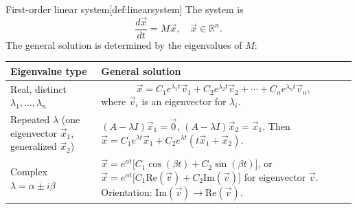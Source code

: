 \begin{define}{First-order linear system}[def:linearsystem]
  The system is
  $$
  \frac{d\vec{x}}{dt} = M\vec{x},\quad \vec{x} \in \mathbb{R}^n.
  $$
  The general solution is determined by the eigenvalues of $M$:

  \renewcommand{\arraystretch}{1.6}%
  \begin{center}
  \small
  \begin{tabularx}{\textwidth}{|l|X|}
    \hline
    \textbf{Eigenvalue type} & \textbf{General solution} \\
    \hline
    Real, distinct $\lambda_1,\ldots,\lambda_n$ & 
    \[
    \vec{x} = C_1 e^{\lambda_1 t}\vec{v}_1 + C_2 e^{\lambda_2 t}\vec{v}_2 + \cdots + C_n e^{\lambda_n t}\vec{v}_n,
    \]
    where $\vec{v}_i$ is an eigenvector for $\lambda_i$. \\
    \hline
    Repeated $\lambda$ (one eigenvector $\vec{x}_1$, generalized $\vec{x}_2$) & $(A - \lambda I)\vec{x}_1 = \vec{0}$, $(A - \lambda I)\vec{x}_2 = \vec{x}_1$. Then $\displaystyle \vec{x} = C_1 e^{\lambda t}\vec{x}_1 + C_2 e^{\lambda t}(t\vec{x}_1 + \vec{x}_2)$. \\
    \hline
    Complex $\lambda = \alpha \pm i\beta$ & $\displaystyle \vec{x} = e^{\alpha t}\bigl[C_1 \cos(\beta t) + C_2 \sin(\beta t)\bigr]$, or $\vec{x} = e^{\alpha t}\bigl[C_1 \mathrm{Re}(\vec{v}) + C_2 \mathrm{Im}(\vec{v})\bigr]$ for eigenvector $\vec{v}$. Orientation: $\mathrm{Im}(\vec{v}) \to \mathrm{Re}(\vec{v})$. \\
    \hline
  \end{tabularx}
  \end{center}
\end{define}



